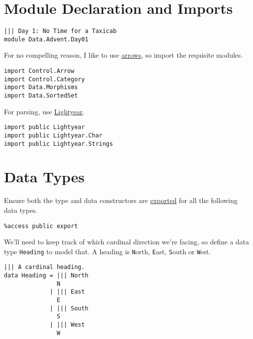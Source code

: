 \documentclass[b5paper,twoside]{amsbook}
\begin{document}
\newpage

\section{Module Declaration and
Imports}\label{module-declaration-and-imports}

\begin{verbatim}
||| Day 1: No Time for a Taxicab
module Data.Advent.Day01
\end{verbatim}

For no compelling reason, I like to use
\href{https://www.haskell.org/arrows/}{arrows}, so import the requisite
modules.

\begin{verbatim}
import Control.Arrow
import Control.Category
import Data.Morphisms
import Data.SortedSet
\end{verbatim}

For parsing, use \href{https://github.com/ziman/lightyear}{Lightyear}.

\begin{verbatim}
import public Lightyear
import public Lightyear.Char
import public Lightyear.Strings
\end{verbatim}

\section{Data Types}\label{data-types}

Ensure both the type and data constructors are
\href{http://docs.idris-lang.org/en/latest/tutorial/modules.html\#meaning-for-data-types}{exported}
for all the following data types.

\begin{verbatim}
%access public export
\end{verbatim}

We'll need to keep track of which cardinal direction we're facing, so
define a data type \texttt{Heading} to model that. A
heading is \texttt{N}orth, \texttt{E}ast,
\texttt{S}outh or \texttt{W}est.

\begin{verbatim}
||| A cardinal heading.
data Heading = ||| North
               N
             | ||| East
               E
             | ||| South
               S
             | ||| West
               W
\end{verbatim}
\end{document}
